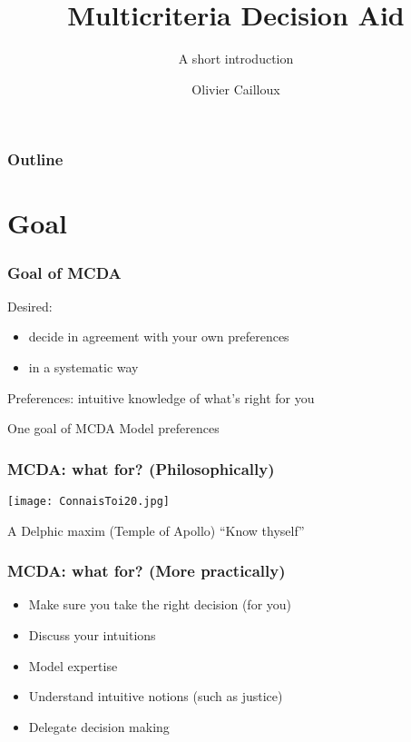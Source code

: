 \documentclass[french,english]{beamer}
\title{Multicriteria Decision Aid}
\subtitle{A short introduction}
\author{Olivier Cailloux}
\institute[LAMSADE]{LAMSADE, Université Paris-Dauphine}
\date{\formatdate{18}{4}{2017}}
\begin{document}
\begin{frame}[plain]
	\titlepage
\end{frame}
\addtocounter{framenumber}{-1}

\begin{frame}
	\frametitle{Outline}
	\tableofcontents[subsectionstyle=hide]
\end{frame}

\section{Goal}
\begin{frame}
	\frametitle{Goal of \ac{MCDA}}
	Desired:
	\begin{itemize}
		\item decide in agreement with your own preferences
		\item in a systematic way
	\end{itemize}
	Preferences: intuitive knowledge of what’s right for you
	\begin{block}{One goal of \ac{MCDA}}
		Model preferences
	\end{block}
\end{frame}

\begin{frame}
	\frametitle{\ac{MCDA}: what for? (Philosophically)}
	\centering
	\texttt{[image: ConnaisToi20.jpg]}
	\begin{block}{A Delphic maxim (Temple of Apollo)}
	\centering
		“Know thyself”
	\end{block}
\end{frame}

\begin{frame}
	\frametitle{\ac{MCDA}: what for? (More practically)}
	\begin{itemize}
		\item Make sure you take the right decision (for you)
		\item Discuss your intuitions
		\item Model expertise
		\item Understand intuitive notions (such as justice)
		\item Delegate decision making
	\end{itemize}
\end{frame}
\end{document}

